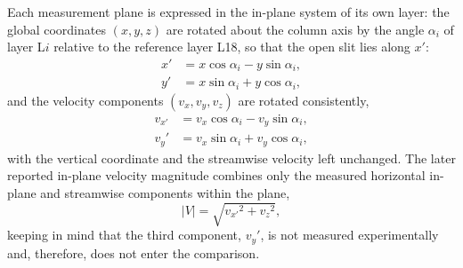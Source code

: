 Each measurement plane is expressed in the in-plane system of its own layer: the global coordinates $(x,y,z)$ are rotated about the column axis by the angle $\alpha_i$ of layer L$i$ relative to the reference layer L18, so that the open slit lies along $x'$:
\begin{subequations}
\label{eq:transform}
\begin{align}
    x' &= x\cos\alpha_i - y\sin\alpha_i, \\
    y' &= x\sin\alpha_i + y\cos\alpha_i,
\end{align}
\end{subequations}
and the velocity components $(v_x, v_y, v_z)$ are rotated consistently,
\begin{subequations}
\label{eq:transform_vel}
\begin{align}
    v_{x'} &= v_x\cos\alpha_i - v_y\sin\alpha_i, \\
    v_y' &= v_x\sin\alpha_i + v_y\cos\alpha_i,
\end{align}
\end{subequations}
with the vertical coordinate and the streamwise velocity left unchanged. The later reported in-plane velocity magnitude combines only the measured horizontal in-plane and streamwise components within the plane,
\begin{equation}
    |V| = \sqrt{ {v_{x'}}^2 + {v_z}^2 },
    \label{eq:velmag}
\end{equation}
keeping in mind that the third component, $v_y'$, is not measured experimentally and, therefore, does not enter the comparison.
